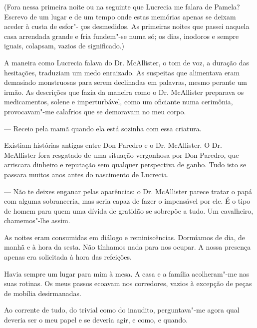 (Fora nessa primeira noite ou na seguinte que Lucrecia me falara de
Pamela? Escrevo de um lugar e de um tempo onde estas memórias apenas se
deixam aceder à custa de esfor"- ços desmedidos. As primeiras noites que
passei naquela casa arrendada grande e fria fundem"-se numa só; os dias,
inodoros e sempre iguais, colapsam, vazios de significado.)

A maneira como Lucrecia falava do Dr. McAllister, o tom de voz, a
duração das hesitações, traduziam um medo enraizado. As suspeitas que alimentava eram demasiado monstruosas para serem
declinadas em palavras, mesmo perante um irmão. As descrições que fazia
da maneira como o Dr. McAllister preparava os medicamentos, solene e
imperturbável, como um oficiante numa cerimônia, provocavam"-me calafrios
que se demoravam no meu corpo.

--- Receio pela mamã quando ela está sozinha com essa criatura.

Existiam histórias antigas entre Don Paredro e o Dr. McAllister. O Dr.
McAllister fora resgatado de uma situação vergonhosa por Don Paredro,
que arriscara dinheiro e reputação sem qualquer perspectiva de ganho.
Tudo isto se passara muitos anos antes do nascimento de Lucrecia.

--- Não te deixes enganar pelas aparências: o Dr. McAllister parece
  tratar o papá com alguma sobranceria, mas seria capaz de fazer o
  impensável por ele. É o tipo de homem para quem uma dívida de gratidão
  se sobrepõe a tudo. Um cavalheiro, chamemos"-lhe assim.

As noites eram consumidas em diálogo e reminiscências. Dormíamos de dia,
de manhã e à hora da sesta. Não tínhamos nada para nos ocupar. A nossa
presença apenas era solicitada à hora das refeições.

Havia sempre um lugar para mim à mesa. A casa e a família acolheram"-me
nas suas rotinas. Os meus passos ecoavam nos corredores, vazios à
excepção de peças de mobília desirmanadas.

Ao corrente de tudo, do trivial como do inaudito, perguntava"-me agora
qual deveria ser o meu papel e se deveria agir, e como, e quando.

